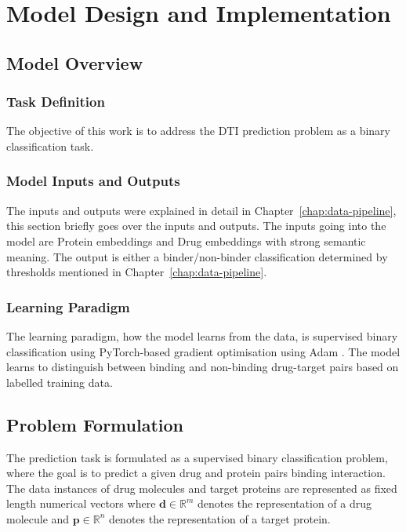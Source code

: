 \chapter{Model Design and Implementation}
\section{Model Overview}
\subsection{Task Definition}
The objective of this work is to address the DTI prediction problem as a binary classification task.

\subsection{Model Inputs and Outputs}
The inputs and outputs were explained in detail in Chapter~\ref{chap:data-pipeline}, this section briefly goes over the inputs and outputs.
The inputs going into the model are Protein embeddings and Drug embeddings with strong semantic meaning.
The output is either a binder/non-binder classification determined by thresholds mentioned in Chapter~\ref{chap:data-pipeline}.

\subsection{Learning Paradigm}
The learning paradigm, how the model learns from the data, is supervised binary classification using PyTorch-based gradient optimisation using Adam \citep{kingma2015adam}.
The model learns to distinguish between binding and non-binding drug-target pairs based on labelled training data.

\section{Problem Formulation}
The prediction task is formulated as a supervised binary classification problem, where the goal is to predict a given drug and protein pairs binding interaction.
The data instances of drug molecules and target proteins are represented as fixed length numerical vectors where $\mathbf{d} \in \mathbb{R}^{m}$ denotes the representation of a drug molecule and $\mathbf{p} \in \mathbb{R}^{n}$ denotes the representation of a target protein.

